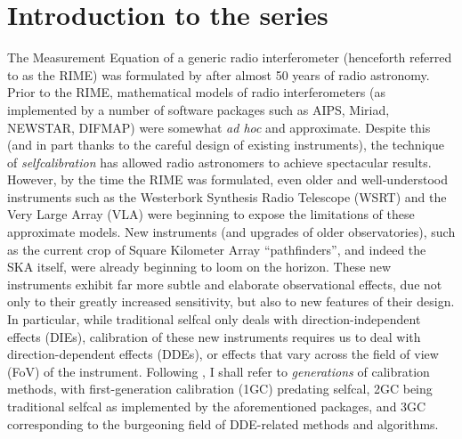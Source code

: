 \documentclass[referee]{aa}
\begin{document}

\maketitle

\section*{Introduction to the series}

The Measurement Equation of a generic radio interferometer (henceforth referred to as the RIME) was formulated by \citet{ME1} after almost 50 years of radio astronomy. Prior to the RIME, mathematical models of radio interferometers (as implemented by a number of software packages such as AIPS, Miriad, NEWSTAR, DIFMAP) were somewhat \emph{ad hoc} and approximate. Despite this (and in part thanks to the careful design of existing instruments), the technique of {\em selfcalibration} \citep{Cornwell:selfcal} has allowed radio astronomers to achieve spectacular results. However, by the time the RIME was formulated, even older and well-understood instruments such as the Westerbork Synthesis Radio Telescope (WSRT) and the Very Large Array (VLA) were beginning to expose the limitations of these approximate models. New instruments (and upgrades of older observatories), such as the current crop of Square Kilometer Array \citep{Schilizzi:SKA} ``pathfinders'', and indeed the SKA itself, were already beginning to loom on the horizon. These new instruments exhibit far more subtle and elaborate observational effects, due not only to their greatly increased sensitivity, but also to new features of their design. In particular, while traditional selfcal only deals with direction-independent effects (DIEs), calibration of these new instruments requires us to deal with direction-dependent effects (DDEs), or effects that vary across the field of view (FoV) of the instrument. Following \citet{meqtrees}, I shall refer to \emph{generations} of calibration methods, with first-generation calibration (1GC) predating selfcal, 2GC being traditional selfcal as implemented by the aforementioned packages, and 3GC corresponding to the burgeoning field of DDE-related methods and algorithms. 
\end{document}
